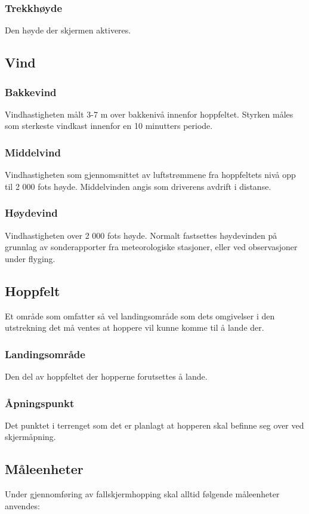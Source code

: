 \subsubsection{Trekkhøyde}
Den høyde der skjermen aktiveres.

\subsection{Vind}
\subsubsection{Bakkevind}
Vindhastigheten målt 3-7 m over bakkenivå innenfor hoppfeltet. Styrken måles som sterkeste vindkast innenfor en 10 minutters periode.

\subsubsection{Middelvind}
Vindhastigheten som gjennomsnittet av luftstrømmene fra hoppfeltets nivå opp til 2 000 fots høyde. Middelvinden angis som driverens avdrift i distanse.

\subsubsection{Høydevind}
Vindhastigheten over 2 000 fots høyde. Normalt fastsettes høydevinden på grunnlag av sonderapporter fra meteorologiske stasjoner, eller ved observasjoner under flyging.

\subsection{Hoppfelt}
Et område som omfatter så vel landingsområde som dets omgivelser i den utstrekning det må ventes at hoppere vil kunne komme til å lande der.

\subsubsection{Landingsområde}
Den del av hoppfeltet der hopperne forutsettes å lande.

\subsubsection{Åpningspunkt}
Det punktet i terrenget som det er planlagt at hopperen skal befinne seg over ved skjermåpning.

\subsection{Måleenheter}
Under gjennomføring av fallskjermhopping skal alltid følgende måleenheter anvendes:

